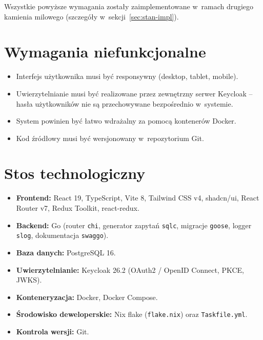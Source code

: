 \documentclass[12pt, a4paper, oneside]{article}
\begin{document}
Wszystkie powyższe wymagania zostały zaimplementowane w~ramach drugiego kamienia milowego (szczegóły w~sekcji~\ref{sec:stan-impl}).

\section{Wymagania niefunkcjonalne}

\begin{itemize}
  \item Interfejs użytkownika musi być responsywny (desktop, tablet, mobile).
  \item Uwierzytelnianie musi być realizowane przez zewnętrzny serwer Keycloak -- hasła użytkowników nie są przechowywane bezpośrednio w~systemie.
  \item System powinien być łatwo wdrażalny za pomocą kontenerów Docker.
  \item Kod źródłowy musi być wersjonowany w~repozytorium Git.
\end{itemize}

\section{Stos technologiczny}

\begin{itemize}
  \item \textbf{Frontend:} React 19, TypeScript, Vite 8, Tailwind CSS v4, shadcn/ui, React Router v7, Redux Toolkit, react-redux.
  \item \textbf{Backend:} Go (router \texttt{chi}, generator zapytań \texttt{sqlc}, migracje \texttt{goose}, logger \texttt{slog}, dokumentacja \texttt{swaggo}).
  \item \textbf{Baza danych:} PostgreSQL 16.
  \item \textbf{Uwierzytelnianie:} Keycloak 26.2 (OAuth2 / OpenID Connect, PKCE, JWKS).
  \item \textbf{Konteneryzacja:} Docker, Docker Compose.
  \item \textbf{Środowisko deweloperskie:} Nix flake (\texttt{flake.nix}) oraz \texttt{Taskfile.yml}.
  \item \textbf{Kontrola wersji:} Git.
\end{itemize}
\end{document}
